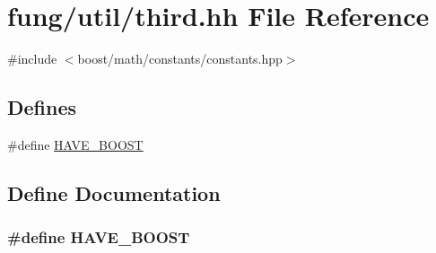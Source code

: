 \hypertarget{third_8hh}{\section{fung/util/third.hh \-File \-Reference}
\label{third_8hh}
}
{\ttfamily \#include $<$boost/math/constants/constants.\-hpp$>$}\*
\subsection*{\-Defines}
\begin{DoxyCompactItemize}
\item 
\#define \hyperlink{third_8hh_a1644f282a4f84575a270f96b98d4f3c6}{\-H\-A\-V\-E\-\_\-\-B\-O\-O\-S\-T}
\end{DoxyCompactItemize}


\subsection{\-Define \-Documentation}
\hypertarget{third_8hh_a1644f282a4f84575a270f96b98d4f3c6}{
\subsubsection[{\-H\-A\-V\-E\-\_\-\-B\-O\-O\-S\-T}]{\setlength{\rightskip}{0pt plus 5cm}\#define {\bf \-H\-A\-V\-E\-\_\-\-B\-O\-O\-S\-T}}}\label{third_8hh_a1644f282a4f84575a270f96b98d4f3c6}
